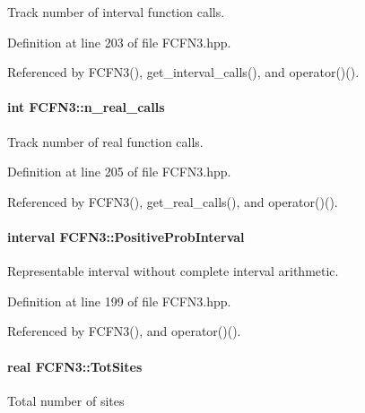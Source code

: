\-Track number of interval function calls. 



\-Definition at line 203 of file \-F\-C\-F\-N3.\-hpp.



\-Referenced by \-F\-C\-F\-N3(), get\-\_\-interval\-\_\-calls(), and operator()().

\hypertarget{classFCFN3_a6af9c2e333d52639535dc61516f8f984}{
\paragraph[{n\-\_\-real\-\_\-calls}]{\setlength{\rightskip}{0pt plus 5cm}int {\bf \-F\-C\-F\-N3\-::n\-\_\-real\-\_\-calls}}}\label{classFCFN3_a6af9c2e333d52639535dc61516f8f984}


\-Track number of real function calls. 



\-Definition at line 205 of file \-F\-C\-F\-N3.\-hpp.



\-Referenced by \-F\-C\-F\-N3(), get\-\_\-real\-\_\-calls(), and operator()().

\hypertarget{classFCFN3_a53e77ef0b53f0fea50abd6e87f8a1c00}{
\paragraph[{\-Positive\-Prob\-Interval}]{\setlength{\rightskip}{0pt plus 5cm}interval {\bf \-F\-C\-F\-N3\-::\-Positive\-Prob\-Interval}}}\label{classFCFN3_a53e77ef0b53f0fea50abd6e87f8a1c00}


\-Representable interval without complete interval arithmetic. 



\-Definition at line 199 of file \-F\-C\-F\-N3.\-hpp.



\-Referenced by \-F\-C\-F\-N3(), and operator()().

\hypertarget{classFCFN3_ac61db05a36bdc21a29f38afed405c188}{
\paragraph[{\-Tot\-Sites}]{\setlength{\rightskip}{0pt plus 5cm}real {\bf \-F\-C\-F\-N3\-::\-Tot\-Sites}}}\label{classFCFN3_ac61db05a36bdc21a29f38afed405c188}
\-Total number of sites 

